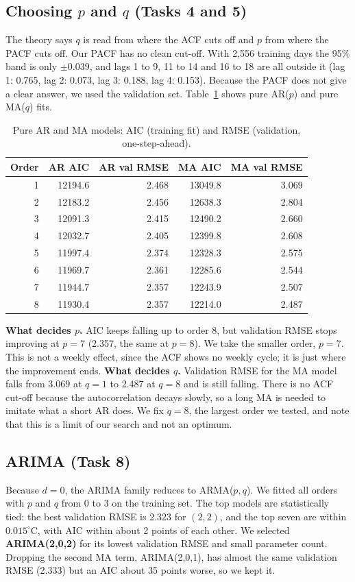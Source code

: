 \documentclass[11pt,a4paper]{article}
\begin{document}
\subsection{Choosing $p$ and $q$ (Tasks 4 and 5)}
The theory says $q$ is read from where the ACF cuts off and $p$ from where the PACF cuts off. Our PACF has no clean cut-off. With 2,556 training days the 95\% band is only $\pm 0.039$, and lags 1 to 9, 11 to 14 and 16 to 18 are all outside it (lag 1: 0.765, lag 2: 0.073, lag 3: 0.188, lag 4: 0.153). Because the PACF does not give a clear answer, we used the validation set. Table~\ref{tab:arma} shows pure AR($p$) and pure MA($q$) fits.

\begin{table}[H]\centering
\caption{Pure AR and MA models: AIC (training fit) and RMSE (validation, one-step-ahead).}\label{tab:arma}
\begin{tabular}{rrrrr}
\toprule
Order & AR AIC & AR val RMSE & MA AIC & MA val RMSE\\
\midrule
1 & 12194.6 & 2.468 & 13049.8 & 3.069\\
2 & 12183.2 & 2.456 & 12638.3 & 2.804\\
3 & 12091.3 & 2.415 & 12490.2 & 2.660\\
4 & 12032.7 & 2.405 & 12399.8 & 2.608\\
5 & 11997.4 & 2.374 & 12328.3 & 2.575\\
6 & 11969.7 & 2.361 & 12285.6 & 2.544\\
7 & 11944.7 & 2.357 & 12243.9 & 2.507\\
8 & 11930.4 & 2.357 & 12214.0 & 2.487\\
\bottomrule
\end{tabular}
\end{table}

\textbf{What decides $p$.} AIC keeps falling up to order 8, but validation RMSE stops improving at $p=7$ (2.357, the same at $p=8$). We take the smaller order, $p=7$. This is not a weekly effect, since the ACF shows no weekly cycle; it is just where the improvement ends. \textbf{What decides $q$.} Validation RMSE for the MA model falls from 3.069 at $q=1$ to 2.487 at $q=8$ and is still falling. There is no ACF cut-off because the autocorrelation decays slowly, so a long MA is needed to imitate what a short AR does. We fix $q=8$, the largest order we tested, and note that this is a limit of our search and not an optimum.

\subsection{ARIMA (Task 8)}
Because $d=0$, the ARIMA family reduces to ARMA($p,q$). We fitted all orders with $p$ and $q$ from 0 to 3 on the training set. The top models are statistically tied: the best validation RMSE is 2.323 for $(2,2)$, and the top seven are within $0.015^\circ$C, with AIC within about 2 points of each other. We selected \textbf{ARIMA(2,0,2)} for its lowest validation RMSE and small parameter count. Dropping the second MA term, ARIMA(2,0,1), has almost the same validation RMSE (2.333) but an AIC about 35 points worse, so we kept it.
\end{document}
